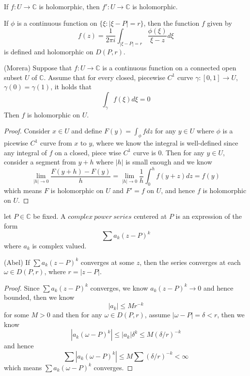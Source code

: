 \documentclass[lang=en, color=blue, ]{elegantbook}
\newcommand{\C}{\mathbb{C}}
\begin{document}
\begin{corollary}
    If $f:U\to\C$ is holomorphic, then $f':U\to \C$ is holomorphic.
\end{corollary}

\begin{theorem}
    If $\phi$ is a continuous function on $\{\xi:|\xi-P| = r\}$, then the function $f$ given by
    \[
    f(z) = \dfrac{1}{2\pi i}\int_{|\xi-P|=r}\dfrac{\phi(\xi)}{\xi-z}d\xi
    \]
    is defined and holomorphic on $D(P,r)$.
\end{theorem}

\begin{theorem}
    (Morera) Suppose that $f:U\to \C$ is a continuous function on a connected open subset $U$ of $\C$. Assume that for every closed, piecewise $C^1$ curve $\gamma:[0,1]\to U$, $\gamma(0) = \gamma(1)$, it holds that
    \[
    \int_{\gamma} f(\xi) d\xi = 0
    \]
    Then $f$ is holomorphic on $U$.
\end{theorem}
\begin{proof}
    Consider $x\in U$ and define $F(y) = \int_{\phi} fdz$ for any $y\in U$ where $\phi$ is a picewise $C^1$ curve from $x$ to $y$, where we know the integral is well-defined since any integral of $f$ on a closed, piece wise $C^1$ curve is $0$. Then for any $y\in U$, consider a segment from $y+h$ where $|h|$ is small enough and we know
    \[
    \lim_{|h|\to 0}\dfrac{F(y+h)-F(y)}{h} = \lim_{|h|\to 0}\dfrac{1}{h}\int_0^h f(y+z) dz = f(y)
    \]
    which means $F$ is holomorphic on $U$ and $F' = f$ on $U$, and hence $f$ is holomorphic on $U$.
\end{proof}

\begin{definition}
    let $P\in\C$ be fixed. A $complex\ power\ series$ centered at $P$ is an expression of the form
    \[
    \sum a_k(z-P)^k
    \]
    where $a_k$ is complex valued.
\end{definition}

\begin{lemma}
    (Abel) If $\sum a_k(z-P)^k$ converges at some $z$, then the series converges at each $\omega \in D(P,r)$, where $r = |z-P|$.
\end{lemma}
\begin{proof}\par
    Since $\sum a_k(z-P)^k$ converges, we know $a_k(z-P)^k \to 0$ and hence bounded, then we know 
    \[
    |a_k| \leq Mr^{-k}
    \]
    for some $M>0$ and then for any $\omega \in D(P,r)$, assume $|\omega - P| = \delta < r$, then we know
    \[
    |a_k(\omega-P)^k| \leq |a_k|\delta^k \leq M(\delta/r)^{-k}
    \]
    and hence
    \[
    \sum |a_k(\omega-P)^k| \leq M\sum (\delta/r)^{-k} < \infty
    \]
    which means $\sum a_k(\omega-P)^k$ converges.
\end{proof}
\end{document}
